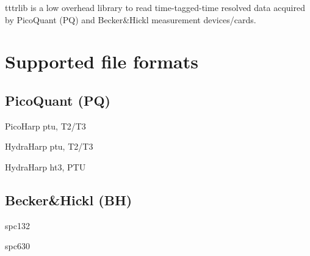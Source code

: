 tttrlib is a low overhead library to read time-\/tagged-\/time resolved data acquired by Pico\+Quant (PQ) and Becker\&Hickl measurement devices/cards.

\section*{Supported file formats }

\subsection*{Pico\+Quant (PQ) }


\begin{DoxyItemize}
\item Pico\+Harp ptu, T2/\+T3
\item Hydra\+Harp ptu, T2/\+T3
\item Hydra\+Harp ht3, P\+TU
\end{DoxyItemize}

\subsection*{Becker\&Hickl (BH) }


\begin{DoxyItemize}
\item spc132
\item spc630 
\end{DoxyItemize}